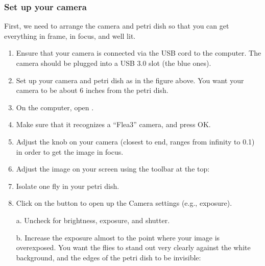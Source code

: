 \documentclass[letterpaper,10pt,english]{jupyterBook}
\begin{document}
\subsubsection{Set up your camera}
\label{\detokenize{Drosophila/Day1:set-up-your-camera}}
\sphinxAtStartPar
{}

\sphinxAtStartPar
First, we need to arrange the camera and petri dish so that you can get everything in frame, in focus, and well lit.
\begin{enumerate}
%
\item {} 
\sphinxAtStartPar
Ensure that your camera is connected via the USB cord to the computer. The camera should be plugged into a USB 3.0 slot (the blue ones).

\item {} 
\sphinxAtStartPar
Set up your camera and petri dish as in the figure above. You want your camera to be about 6 inches from the petri dish.

\item {} 
\sphinxAtStartPar
On the computer, open .

\item {} 
\sphinxAtStartPar
Make sure that it recognizes a “Flea3” camera, and press OK.

\item {} 
\sphinxAtStartPar
Adjust the  knob on your camera (closest to end, ranges from infinity to 0.1) in order to get the image in focus.

\item {} 
\sphinxAtStartPar
Adjust the image on your screen using the toolbar at the top:

\sphinxAtStartPar
{}

\item {} 
\sphinxAtStartPar
Isolate one fly in your petri dish.

\item {} 
\sphinxAtStartPar
Click on the button to open up the Camera settings (e.g., exposure).

\sphinxAtStartPar
a. Uncheck  for brightness, exposure, and shutter.

\sphinxAtStartPar
b. Increase the exposure almost to the point where your image is overexposed. You want the flies to stand out very clearly against the white background, and the edges of the petri dish to be invisible:


\end{enumerate}
\end{document}
